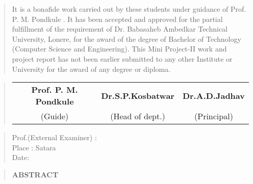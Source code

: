 \documentclass[12pt]{report}
\begin{document}
	\vspace{0.7cm}
	\begin{quote}
		\normalsize
		It is a bonafide work carried out by these students under guidance of
		Prof. P. M. Pondkule . It has been accepted and approved for the partial
		fulfillment of the requirement of Dr. Babasaheb Ambedkar Technical
		University, Lonere, for the award of the degree of Bachelor of
		Technology (Computer Science and Engineering). This Mini Project-II work and project
		report has not been earlier submitted to any other Institute or University for the
		award of any degree or diploma.
	\end{quote}
	
	\begin{quote}
		\normalsize
		\centering
		\vspace{3cm}
		\begin{table}[ht]
			\centering
			\begin{tabular}{c   c   c}
				\bfseries
				Prof. P. M. Pondkule & \bfseries Dr.S.P.Kosbatwar & \bfseries Dr.A.D.Jadhav \\[2ex]
				(Guide) & (Head of dept.) & (Principal)\\[2ex]
			\end{tabular}
		\end{table}
	\end{quote}
	\vspace{2cm}
	\begin{quote}
		Prof.(External Examiner) :\\Place : Satara\\Date:
	\end{quote}
	\newpage
	
	
	\begin{quote}
		\centering
		\LARGE
		\textbf{ABSTRACT}
	\end{quote}
	
\end{document}
